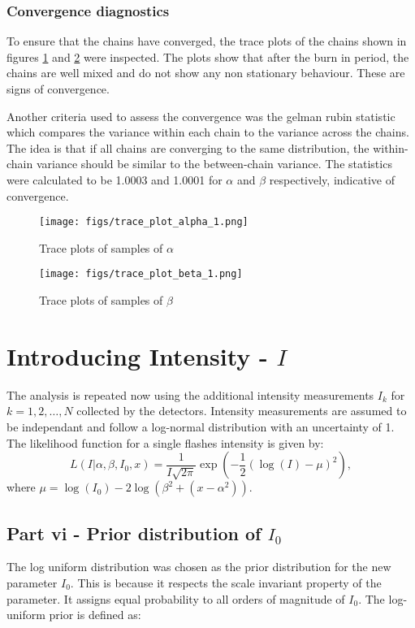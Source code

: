 \documentclass[11pt]{article}
\begin{document}
\subsubsection{Convergence diagnostics}
To ensure that the chains have converged, the trace plots of the chains shown in figures \ref{fig:trace_plots_alpha_1} and \ref{fig:trace_plots_beta_1} were inspected. The plots show that after the burn in period, the chains are well mixed and do not show any non stationary behaviour. These are signs of convergence.

Another criteria used to assess the convergence was the gelman rubin statistic which compares the variance within each chain to the variance across the chains. The idea is that if all chains are converging to the same distribution, the within-chain variance should be similar to the between-chain variance. The statistics were calculated to be 1.0003 and 1.0001 for $\alpha$ and $\beta$ respectively, indicative of convergence.

\begin{figure}[H]
    \centering
    \texttt{[image: figs/trace\_plot\_alpha\_1.png]}
    \caption{Trace plots of samples of $\alpha$}
    \label{fig:trace_plots_alpha_1}
\end{figure}

\begin{figure}[H]
    \centering
    \texttt{[image: figs/trace\_plot\_beta\_1.png]}
    \caption{Trace plots of samples of $\beta$}
    \label{fig:trace_plots_beta_1}
\end{figure}
\section{Introducing Intensity - $I$}
The analysis is repeated now using the additional intensity measurements $I_k$ for $k = 1, 2, \ldots, N$ collected by the detectors. Intensity measurements are assumed to be independant and follow a log-normal distribution with an uncertainty of 1. The likelihood function for a single flashes intensity is given by:
\begin{equation}
    L(I|\alpha,\beta, I_0, x) = \frac{1}{I\sqrt{2\pi}} \exp\left(-\frac{1}{2} \left( \log(I) - \mu\right)^2 \right),
    \label{eq:likelihood_intensity}
\end{equation}
where $\mu = \log(I_0) - 2\log{\left(\beta^2+(x-\alpha^2)\right)}$.

\subsection{Part vi - Prior distribution of $I_0$}
The log uniform distribution was chosen as the prior distribution for the new parameter $I_0$. This is because it respects the scale invariant property of the parameter. It assigns equal probability to all orders of magnitude of $I_0$. The log-uniform prior is defined as:
\end{document}
